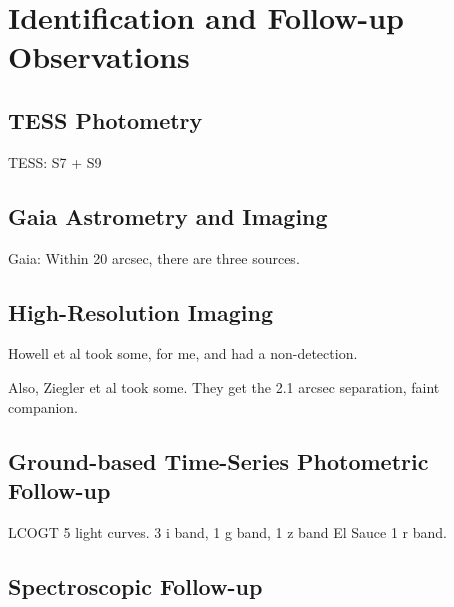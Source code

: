 \documentclass[12pt,twocolumn,tighten]{aastex63}
\begin{document}
\section{Identification and Follow-up Observations}
\label{sec:observations}


  \subsection{TESS Photometry}
  \label{subsec:tess}
  TESS: S7 + S9

  \subsection{Gaia Astrometry and Imaging}
  \label{subsec:gaia}
  Gaia:
    Within 20 arcsec, there are three sources. 






  \subsection{High-Resolution Imaging}
  \label{subsec:speckle}
  Howell et al took some, for me, and had a non-detection.

  Also, Ziegler et al took some.
    They get the 2.1 arcsec separation, faint companion.

  \subsection{Ground-based Time-Series Photometric Follow-up}
  \label{subsec:groundphot}
  LCOGT
    5 light curves. 3 i band, 1 g band, 1 z band
  El Sauce
    1 r band.

  \subsection{Spectroscopic Follow-up}
  \label{subsec:spectra}
\end{document}
